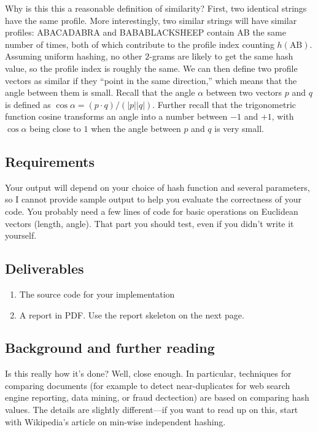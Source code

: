 \documentclass{tufte-handout}
\begin{document}
\medskip
Why is this this a reasonable definition of similarity?
First, two identical strings have the same profile.
More interestingly, two similar strings will have similar profiles: ABACADABRA and BABABLACKSHEEP contain AB the same number of times, both of which contribute to the profile index counting $h(\text{AB})$.
Assuming uniform hashing, no other $2$-grams are likely to get the same hash value, so the profile index is roughly the same.
We can then define two profile vectors as similar if they ``point in the same direction,''
which means that the angle between them is small.
Recall that the angle $\alpha$ between two vectors $p$ and $q$ is defined as \(
  \cos \alpha =
    (p\cdot q)/(\left|p\right| \left|q\right|).
    \)
Further recall that the trigonometric function cosine transforms an angle into a number between $-1$ and $+1$, with $\cos\alpha$ being close to $1$ when the angle between $p$ and $q$ is very small.

\subsection{Requirements}

Your output will depend on your choice of hash function and several parameters, so I cannot provide sample output to help you evaluate the correctness of your code.
You probably need a few lines of code for basic operations on Euclidean vectors (length, angle).
That part you should test, even if you didn't write it yourself.

\subsection{Deliverables}

\begin{enumerate}
  \item The source code for your implementation
  \item A report in PDF.
  Use the report skeleton on the next page.
  \end{enumerate}

\subsection{Background and further reading}

Is this really how it’s done?
Well, close enough.
In particular, techniques for comparing documents (for
example to detect near-duplicates for web search engine
reporting, data mining, or fraud dectection) are based on
comparing hash values.
The details are slightly different---if you want to read up on this, start with Wikipedia’s article on min-wise independent hashing.
\end{document}
